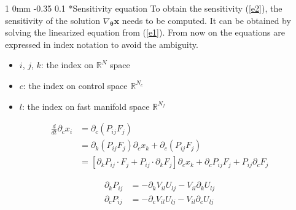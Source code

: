\documentclass[11pt]{article}
\makeatletter
\renewcommand{\subsection}{\@startsection
{subsection}%
{1}%
{0mm}%
{-0.35\baselineskip}%
{0.1\baselineskip}%
{\normalfont\large\bfseries\color{brown}}}%
\def\Dnorm#1#2{ \frac{d #1 }{ d #2} }
\newcommand\eqsp[2]{
\begin{equation#1}
\begin{split}
#2
\end{split}
\end{equation#1}
}
\newcommand{\bx}{\mathbf{x}}
\newcommand{\bt}{\mathbf{\theta}}
\makeatother
\begin{document}
\subsection*{Sensitivity equation}
To obtain the sensitivity (\ref{e2}), the sensitivity of the solution $\nabla_{\bt}\bx$ needs to be computed.
It can be obtained by solving the linearized equation from (\ref{e1}).
From now on the equations are expressed in index notation to avoid the ambiguity.
\begin{itemize}
\item $i$, $j$, $k$: the index on $\mathbb{R}^N$ space
\item $c$: the index on control space $\mathbb{R}^{N_c}$
\item $l$: the index on fast manifold space $\mathbb{R}^{N_f}$
\end{itemize}
\eqsp{}{
\Dnorm{}{t}\partial_cx_i &= \partial_c\left( P_{ij}F_j \right)\\
&= \partial_k\left( P_{ij}F_j \right)\partial_cx_k + \partial_c\left( P_{ij}F_j \right)\\
&= \left[ \partial_kP_{ij}\cdot F_j + P_{ij}\cdot\partial_kF_j \right]\partial_cx_k + \partial_cP_{ij}F_j + P_{ij}\partial_cF_j
\label{e3}
}
\eqsp{}{
\partial_kP_{ij} &= -\partial_kV_{il}U_{lj} - V_{il}\partial_kU_{lj}\\
\partial_cP_{ij} &= -\partial_cV_{il}U_{lj} - V_{il}\partial_cU_{lj}\\
\label{e4}
}
\end{document}

